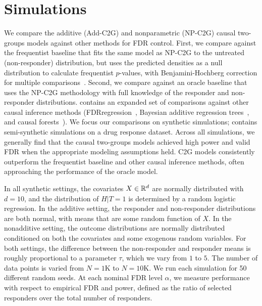 \section{Simulations}
\label{sec:simulations}

We compare the additive (Add-C2G) and nonparametric (NP-C2G) causal two-groups models against other methods for FDR control. First, we compare against the frequentist baseline that fits the same model as NP-C2G to the untreated (non-responder) distribution, but uses the predicted densities as a null distribution to calculate frequentist $p$-values, with Benjamini-Hochberg correction for multiple comparisons~\citep{benjamini:hochberg:1995:bh-fdr}. Second, we compare against an oracle baseline that uses the NP-C2G methodology with full knowledge of the responder and non-responder distributions.  contains an expanded set of comparisons against other causal inference methods (FDRregression~\citep{scott:etal:2014:fdr-regression}, Bayesian additive regression trees~\citep{hill:etal:2011:causal-bart}, and causal forests~\citep{wager:athey:2018:causal-forests}).  We focus our comparisons on synthetic simulations;  contains semi-synthetic simulations on a drug response dataset. Across all simulations, we generally find that the causal two-groups models achieved high power and valid FDR when the appropriate modeling assumptions held. C2G models consistently outperform the frequentist baseline and other causal inference methods, often approaching the performance of the oracle model.

In all synthetic settings, the covariates $X \in \mathbb{R}^d$ are normally distributed with $d=10$, and the distribution of $H| T=1$ is determined by a random logistic regression. In the additive setting, the responder and non-responder distributions are both normal, with means that are some random function of $X$. In the nonadditive setting, the outcome distributions are normally distributed conditioned on both the covariates and some exogenous random variables. For both settings, the difference between the non-responder and responder means is roughly proportional to a parameter $\tau$, which we vary from $1$ to $5$. The number of data points is varied from $N=1$K to $N=10$K. We run each simulation for 50 different random seeds. At each nominal FDR level $\alpha$, we measure performance with respect to empirical FDR and power, defined as the ratio of selected responders over the total number of responders.

%


